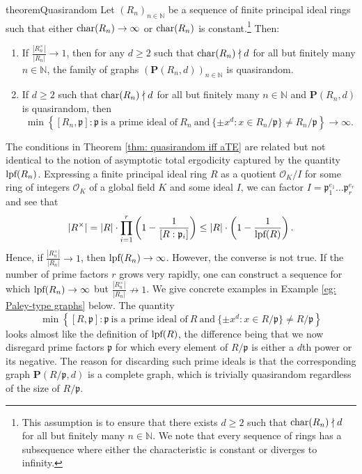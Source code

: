 \documentclass{amsart}
\theoremstyle{definition}
\numberwithin{equation}{section}
\newcommand{\N}{\mathbb{N}}
\newcommand{\p}{\mathfrak{p}}
\newcommand{\bfP}{\mathbf{P}}
\newcommand{\mO}{\mathcal{O}}
\newcommand{\lpf}{\normalfont\text{lpf}}
\renewcommand{\char}{\textup{char}}
\begin{document}
\begin{restatable}{theorem}{Quasirandom} \label{thm: quasirandom iff aTE}
	Let $(R_n)_{n \in \N}$ be a sequence of finite principal ideal rings such that either $\textup{char}(R_n) \to \infty$ or $\textup{char}(R_n)$ is constant.\footnote{This assumption is to ensure that there exists $d \ge 2$ such that $\char(R_n) \nmid d$ for all but finitely many $n \in \N$.
    We note that every sequence of rings has a subsequence where either the characteristic is constant or diverges to infinity.}
	Then:
	\begin{enumerate}[(1)]
        \item If $\frac{|R_n^{\times}|}{|R_n|} \to 1$, then for any $d \ge 2$ such that $\char(R_n) \nmid d$ for all but finitely many $n \in \N$, the family of graphs $\left( \bfP(R_n,d) \right)_{n \in \N}$ is quasirandom.
        \item If $d \ge 2$ such that $\char(R_n) \nmid d$ for all but finitely many $n \in \N$ and $\bfP(R_n, d)$ is quasirandom, then
        \begin{equation*}
            \min \left\{ [R_n, \p] : \p~\text{is a prime ideal of}~R_n~\text{and}~\{\pm x^d : x \in R_n/\p\} \ne R_n/\p \right\} \to \infty.
        \end{equation*}
	\end{enumerate}
\end{restatable}

The conditions in Theorem \ref{thm: quasirandom iff aTE} are related but not identical to the notion of asymptotic total ergodicity captured by the quantity $\lpf(R_n)$.
Expressing a finite principal ideal ring $R$ as a quotient $\mO_K/I$ for some ring of integers $\mO_K$ of a global field $K$ and some ideal $I$, we can factor $I = \p_1^{e_1} \ldots \p_r^{e_r}$ and see that
\begin{equation*}
    |R^{\times}| = |R| \cdot \prod_{i=1}^r \left( 1 - \frac{1}{[R:\p_i]} \right) \leq |R| \cdot \left( 1 - \frac{1}{\lpf(R)} \right).
\end{equation*}
Hence, if $\frac{|R_n^{\times}|}{|R_n|} \to 1$, then $\lpf(R_n) \to \infty$.
However, the converse is not true.
If the number of prime factors $r$ grows very rapidly, one can construct a sequence for which $\lpf(R_n) \to \infty$ but $\frac{|R_n^{\times}|}{|R_n|} \not\to 1$.
We give concrete examples in Example \ref{eg: Paley-type graphs} below. 
The quantity
\begin{equation*}
    \min \left\{ [R, \p] : \p~\text{is a prime ideal of}~R~\text{and}~\{\pm x^d : x \in R/\p\} \ne R/\p \right\}
\end{equation*}
looks almost like the definition of $\lpf(R)$, the difference being that we now disregard prime factors $\p$ for which every element of $R/\p$ is either a $d$th power or its negative.
The reason for discarding such prime ideals is that the corresponding graph $\bfP(R/\p,d)$ is a complete graph, which is trivially quasirandom regardless of the size of $R/\p$.
\end{document}
